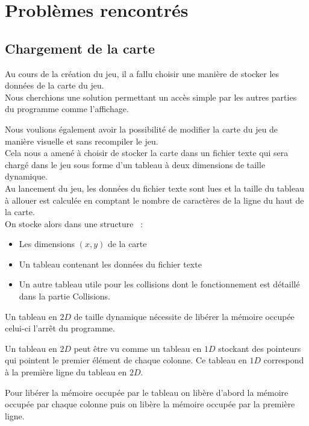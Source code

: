 \documentclass[12pt]{article}
\begin{document}
	\newpage

	\section{Problèmes rencontrés}

		\subsection{Chargement de la carte}
		
			Au cours de la création du jeu, il a fallu choisir une manière de stocker les données de la carte du jeu.\\


			Nous cherchions une solution permettant un accès simple par les autres parties du programme comme l’affichage.
		
			Nous voulions également avoir la possibilité de modifier la carte du jeu de manière visuelle et sans recompiler le jeu.\\


			Cela nous a amené à choisir de stocker la carte dans un fichier texte qui sera chargé dans le jeu sous forme 
			d’un tableau à deux dimensions de taille dynamique.\\
		
			Au lancement du jeu, les données du fichier texte sont lues et la taille du tableau à allouer est calculée en 
			comptant le nombre de caractères de la ligne du haut de la carte.\\
		
			On stocke alors dans une structure  :
			\begin{itemize}
				\item Les dimensions \((x, y)\) de la carte
				\item Un tableau contenant les données du fichier texte
				\item Un autre tableau utile pour les collisions dont le fonctionnement est détaillé dans la partie Collisions.
			\end{itemize}
		
			Un tableau en \(2D\) de taille dynamique nécessite de libérer la mémoire occupée celui-ci l’arrêt du programme.
		
			Un tableau en \(2D\) peut être vu comme un tableau en \(1D\) stockant des pointeurs qui pointent le premier élément 
			de chaque colonne. Ce tableau en \(1D\) correspond à la première ligne du tableau en \(2D\).
		
			Pour libérer la mémoire occupée par le tableau on libère d’abord la mémoire occupée par chaque colonne puis 
			on libère la mémoire occupée par la première ligne.
			
\end{document}
